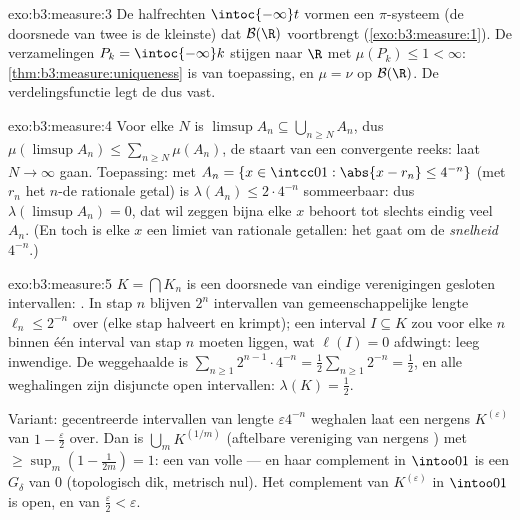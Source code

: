 \begin{solution}{exo:b3:measure:3}
De halfrechten $\intoc{-\infty}t$ vormen een $\pi$-systeem (de
doorsnede van twee is de kleinste) dat $\mathcal B(\R)$ voortbrengt
(\cref{exo:b3:measure:1}). De verzamelingen $P_k =
\intoc{-\infty}k$ stijgen naar $\R$ met $\mu(P_k) \leq 1 <
\infty$: \cref{thm:b3:measure:uniqueness} is van toepassing, en
$\mu = \nu$ op $\mathcal B(\R)$. De verdelingsfunctie legt de 
dus vast.
\end{solution}

\begin{solution}{exo:b3:measure:4}
Voor elke $N$ is $\limsup A_n \subseteq \bigcup_{n \geq N}A_n$,
dus $\mu(\limsup A_n) \leq \sum_{n\geq N}\mu(A_n)$, de staart van
een convergente reeks: laat $N \to \infty$ gaan. Toepassing: met
$A_n = \{x \in \intcc01 : \abs{x - r_n} \leq 4^{-n}\}$ (met $r_n$
het $n$-de rationale getal) is $\lambda(A_n) \leq 2\cdot4^{-n}$
sommeerbaar: dus $\lambda(\limsup A_n) = 0$, dat wil zeggen bijna
elke $x$ behoort tot slechts eindig veel $A_n$. (En toch is elke
$x$ een limiet van rationale getallen: het gaat om de
\emph{snelheid} $4^{-n}$.)
\end{solution}

\begin{solution}{exo:b3:measure:5}
$K = \bigcap K_n$ is een doorsnede van eindige verenigingen
gesloten intervallen: . In stap $n$ blijven $2^n$
intervallen van gemeenschappelijke lengte $\ell_n \leq 2^{-n}$
over (elke stap halveert en krimpt); een interval $I \subseteq K$
zou voor elke $n$ binnen één interval van stap $n$ moeten liggen,
wat $\ell(I) = 0$ afdwingt: leeg inwendige. De weggehaalde  is
$\sum_{n\geq1}2^{n-1}\cdot 4^{-n} = \frac12\sum_{n\geq1}2^{-n} =
\frac12$, en alle weghalingen zijn disjuncte open intervallen:
$\lambda(K) = \frac12$.

Variant: gecentreerde intervallen van lengte $\varepsilon 4^{-n}$
weghalen laat een nergens   $K^{(\varepsilon)}$ van
 $1 - \frac\varepsilon2$ over. Dan is $\bigcup_m K^{(1/m)}$
 (aftelbare vereniging van nergens ) met
 $\geq \sup_m(1 - \frac1{2m}) = 1$: een  van
volle  --- en haar complement in $\intoo01$ is een 
$G_\delta$ van  $0$ (topologisch dik, metrisch nul). Het
complement van $K^{(\varepsilon)}$ in $\intoo01$ is open,  en
van  $\frac\varepsilon2 < \varepsilon$.
\end{solution}


